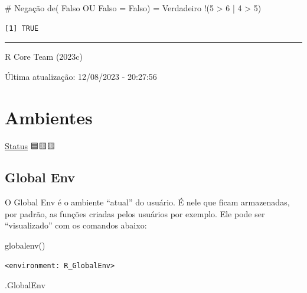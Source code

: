 \documentclass[
  letterpaper,
  DIV=11,
  numbers=noendperiod]{scrreprt}
\newenvironment{Shaded}{\begin{snugshade}}{\end{snugshade}}
\newcommand{\CommentTok}[1]{\textcolor[rgb]{0.37,0.37,0.37}{#1}}
\newcommand{\DecValTok}[1]{\textcolor[rgb]{0.68,0.00,0.00}{#1}}
\newcommand{\FunctionTok}[1]{\textcolor[rgb]{0.28,0.35,0.67}{#1}}
\newcommand{\NormalTok}[1]{\textcolor[rgb]{0.00,0.23,0.31}{#1}}
\newcommand{\SpecialCharTok}[1]{\textcolor[rgb]{0.37,0.37,0.37}{#1}}
\begin{document}
\begin{Shaded}
\begin{Highlighting}[]
\CommentTok{\# Negação de( Falso OU Falso = Falso) = Verdadeiro}
\SpecialCharTok{!}\NormalTok{(}\DecValTok{5} \SpecialCharTok{\textgreater{}} \DecValTok{6} \SpecialCharTok{|} \DecValTok{4} \SpecialCharTok{\textgreater{}} \DecValTok{5}\NormalTok{)}
\end{Highlighting}
\end{Shaded}

\begin{verbatim}
[1] TRUE
\end{verbatim}

\begin{center}\rule{0.5\linewidth}{0.5pt}\end{center}

R Core Team (2023c)

Última atualização: 12/08/2023 - 20:27:56

\hypertarget{ambientes}{%
\chapter{Ambientes}\label{ambientes}}

\protect\hyperlink{status-do-material}{Status} 🟦🟨🟨

\hypertarget{global-env}{%
\section{Global Env}\label{global-env}}

O Global Env é o ambiente ``atual'' do usuário. É nele que ficam
armazenadas, por padrão, as funções criadas pelos usuários por exemplo.
Ele pode ser ``visualizado'' com os comandos abaixo:

\begin{Shaded}
\begin{Highlighting}[]
\FunctionTok{globalenv}\NormalTok{()}
\end{Highlighting}
\end{Shaded}

\begin{verbatim}
<environment: R_GlobalEnv>
\end{verbatim}

\begin{Shaded}
\begin{Highlighting}[]
\NormalTok{.GlobalEnv}
\end{Highlighting}
\end{Shaded}
\end{document}
